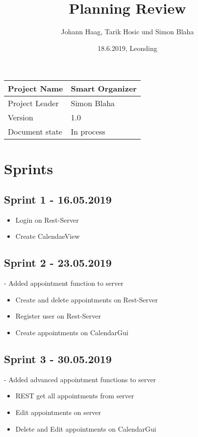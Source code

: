 \documentclass[12pt]{scrartcl}
\title{Planning Review}
\author{Johann Haag, Tarik Hosic und Simon Blaha}
\date{18.6.2019, Leonding}
\begin{document}
    \maketitle
    \begin{flushleft}
    \begin{tabular}{|l|l|}
    \hline
    Project Name & Smart Organizer \\ \hline
    Project Leader & Simon Blaha \\ \hline
    Version & 1.0\\ \hline
    Document state & In process \\ \hline
    \end{tabular}
    \end{flushleft}

    \pagebreak
    \tableofcontents
    \pagebreak

    \section{Sprints}
    \subsection{Sprint 1 - 16.05.2019}
    \begin{itemize}
        \item Login on Rest-Server
        \item Create CalendaeView
    \end{itemize}

    \subsection{Sprint 2 - 23.05.2019}
    - Added appointment function to server
    \begin{itemize}
        \item Create and delete appointments on Rest-Server
        \item Register user on Rest-Server
        \item Create appointments on CalendarGui
    \end{itemize}

    \subsection{Sprint 3 - 30.05.2019}
    - Added advanced appointment functions to server
    \begin{itemize}
        \item REST get all appointments from server
        \item Edit appointments on server
        \item Delete and Edit appointments on CalendarGui
    \end{itemize}
\end{document}
